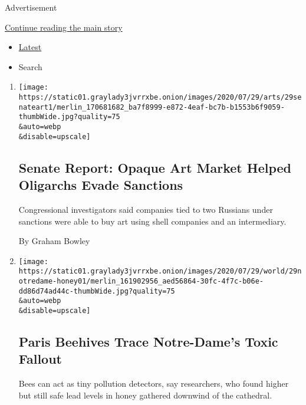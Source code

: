 Advertisement

\protect\hyperlink{after-mid3}{Continue reading the main story}

\begin{itemize}
\tightlist
\item
  \protect\hyperlink{stream-panel}{Latest}
\item
  Search
\end{itemize}

\begin{enumerate}
\def\labelenumi{\arabic{enumi}.}
\item
  \href{/2020/07/29/arts/design/senate-report-art-market-russia-oligarchs-sanctions.html}{}

  \texttt{[image: https://static01.graylady3jvrrxbe.onion/images/2020/07/29/arts/29senateart1/merlin\_170681682\_ba7f8999-e872-4eaf-bc7b-b1553b6f9059-thumbWide.jpg?quality=75\\\&auto=webp\\\&disable=upscale]}

  \hypertarget{senate-report-opaque-art-market-helped-oligarchs-evade-sanctions}{%
  \subsection{Senate Report: Opaque Art Market Helped Oligarchs Evade
  Sanctions}\label{senate-report-opaque-art-market-helped-oligarchs-evade-sanctions}}

  Congressional investigators said companies tied to two Russians under
  sanctions were able to buy art using shell companies and an
  intermediary.

  By Graham Bowley
\item
  \href{/2020/07/29/world/europe/honey-lead-notredame-fire-paris.html}{}

  \texttt{[image: https://static01.graylady3jvrrxbe.onion/images/2020/07/29/world/29notredame-honey01/merlin\_161902956\_aed56864-30fc-4f7c-b06e-dd86d74ad44c-thumbWide.jpg?quality=75\\\&auto=webp\\\&disable=upscale]}

  \hypertarget{paris-beehives-trace-notre-dames-toxic-fallout}{%
  \subsection{Paris Beehives Trace Notre-Dame's Toxic
  Fallout}\label{paris-beehives-trace-notre-dames-toxic-fallout}}

  Bees can act as tiny pollution detectors, say researchers, who found
  higher but still safe lead levels in honey gathered downwind of the
  cathedral.


\end{enumerate}
